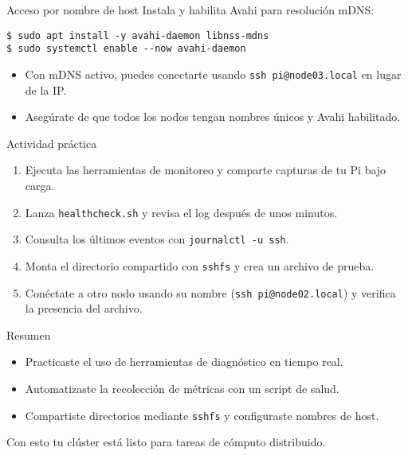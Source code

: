 \documentclass[aspectratio=169,professionalfonts]{beamer}
\begin{document}
\begin{frame}[fragile]{Acceso por nombre de host}
  Instala y habilita Avahi para resolución mDNS:
  \begin{verbatim}
$ sudo apt install -y avahi-daemon libnss-mdns
$ sudo systemctl enable --now avahi-daemon
  \end{verbatim}
  \begin{itemize}
    \item Con mDNS activo, puedes conectarte usando \texttt{ssh pi@node03.local} en lugar de la IP.
    \item Asegúrate de que todos los nodos tengan nombres únicos y Avahi habilitado.
  \end{itemize}
\end{frame}

\begin{frame}[fragile]{Actividad práctica}
  \begin{enumerate}
    \item Ejecuta las herramientas de monitoreo y comparte capturas de tu Pi bajo carga.
    \item Lanza \texttt{healthcheck.sh} y revisa el log después de unos minutos.
    \item Consulta los últimos eventos con \texttt{journalctl -u ssh}.
    \item Monta el directorio compartido con \texttt{sshfs} y crea un archivo de prueba.
    \item Conéctate a otro nodo usando su nombre (\texttt{ssh pi@node02.local}) y verifica la presencia del archivo.
  \end{enumerate}
\end{frame}

\begin{frame}[fragile]{Resumen}
  \begin{itemize}
    \item Practicaste el uso de herramientas de diagnóstico en tiempo real.
    \item Automatizaste la recolección de métricas con un script de salud.
    \item Compartiste directorios mediante \texttt{sshfs} y configuraste nombres de host.
  \end{itemize}
  \vspace{0.5em}
  Con esto tu clúster está listo para tareas de cómputo distribuido.
\end{frame}
\end{document}
